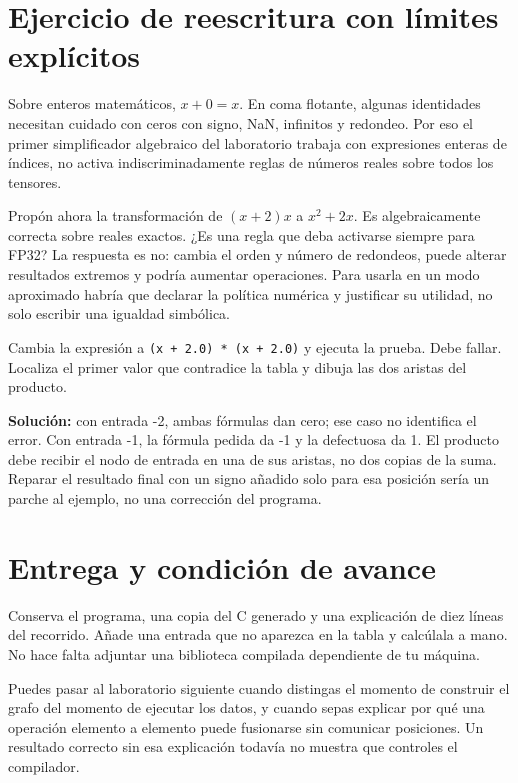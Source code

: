 \documentclass[12pt,a4paper,oneside]{report}
\begin{document}
\section{Ejercicio de reescritura con límites explícitos}
Sobre enteros matemáticos, $x+0=x$. En coma flotante, algunas identidades necesitan cuidado con ceros con signo, NaN, infinitos y redondeo. Por eso el primer simplificador algebraico del laboratorio trabaja con expresiones enteras de índices, no activa indiscriminadamente reglas de números reales sobre todos los tensores.

Propón ahora la transformación de $(x+2)x$ a $x^2+2x$. Es algebraicamente correcta sobre reales exactos. ¿Es una regla que deba activarse siempre para FP32? La respuesta es no: cambia el orden y número de redondeos, puede alterar resultados extremos y podría aumentar operaciones. Para usarla en un modo aproximado habría que declarar la política numérica y justificar su utilidad, no solo escribir una igualdad simbólica.

\begin{practica}
Cambia la expresión a \texttt{(x + 2.0) * \allowbreak{}(x + 2.0)} y ejecuta la prueba. Debe fallar. Localiza el primer valor que contradice la tabla y dibuja las dos aristas del producto.

\textbf{Solución:} con entrada -2, ambas fórmulas dan cero; ese caso no identifica el error. Con entrada -1, la fórmula pedida da -1 y la defectuosa da 1. El producto debe recibir el nodo de entrada en una de sus aristas, no dos copias de la suma. Reparar el resultado final con un signo añadido solo para esa posición sería un parche al ejemplo, no una corrección del programa.

\end{practica}
\section{Entrega y condición de avance}
Conserva el programa, una copia del C generado y una explicación de diez líneas del recorrido. Añade una entrada que no aparezca en la tabla y calcúlala a mano. No hace falta adjuntar una biblioteca compilada dependiente de tu máquina.

Puedes pasar al laboratorio siguiente cuando distingas el momento de construir el grafo del momento de ejecutar los datos, y cuando sepas explicar por qué una operación elemento a elemento puede fusionarse sin comunicar posiciones. Un resultado correcto sin esa explicación todavía no muestra que controles el compilador.
\end{document}
